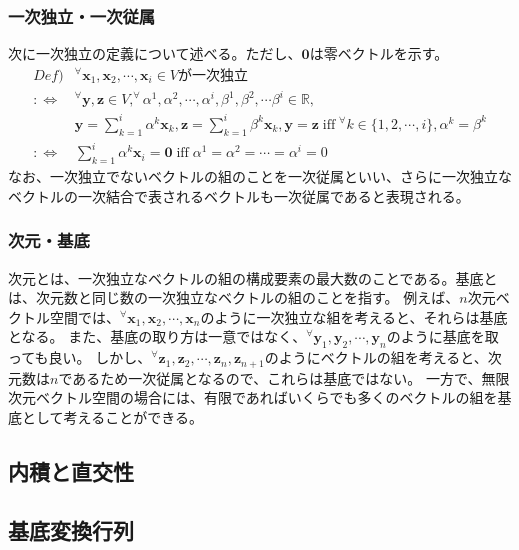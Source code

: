 \documentclass[10pt]{ujarticle}
\begin{document}
\subsubsection{一次独立・一次従属}
次に一次独立の定義について述べる。ただし、$\mathbf{0}$は零ベクトルを示す。
$$
\begin{aligned}
  Def)& ^\forall\mathbf{x}_1,\mathbf{x}_2,\cdots,\mathbf{x}_i\in V\text{が一次独立}\\
  :\Leftrightarrow & ^\forall\mathbf{y},\mathbf{z}\in V, ^\forall\alpha^1,\alpha^2,\cdots,\alpha^i,\beta^1,\beta^2,\cdots\beta^i\in\mathbb{R},\\
  & \mathbf{y}=\sum_{k=1}^{i}\alpha^k\mathbf{x}_k,\mathbf{z}=\sum_{k=1}^{i}\beta^k\mathbf{x}_k,\mathbf{y}=\mathbf{z}\;\text{iff}\; ^\forall k\in\{1,2,\cdots,i\},\alpha^k=\beta^k\\
  :\Leftrightarrow & \sum_{k=1}^{i}\alpha^k\mathbf{x}_i=\mathbf{0}\;\text{iff}\;\alpha^1=\alpha^2=\cdots=\alpha^i=0
\end{aligned}
$$
なお、一次独立でないベクトルの組のことを一次従属といい、さらに一次独立なベクトルの一次結合で表されるベクトルも一次従属であると表現される。

\subsubsection{次元・基底}
次元とは、一次独立なベクトルの組の構成要素の最大数のことである。基底とは、次元数と同じ数の一次独立なベクトルの組のことを指す。
例えば、$n$次元ベクトル空間では、$^\forall\mathbf{x}_1,\mathbf{x}_2,\cdots,\mathbf{x}_n$のように一次独立な組を考えると、それらは基底となる。
また、基底の取り方は一意ではなく、$^\forall\mathbf{y}_1,\mathbf{y}_2,\cdots,\mathbf{y}_n$のように基底を取っても良い。
しかし、$^\forall\mathbf{z}_1,\mathbf{z}_2,\cdots,\mathbf{z}_n,\mathbf{z}_{n+1}$のようにベクトルの組を考えると、次元数は$n$であるため一次従属となるので、これらは基底ではない。
一方で、無限次元ベクトル空間の場合には、有限であればいくらでも多くのベクトルの組を基底として考えることができる。

\hypertarget{innerprod}{\subsection{内積と直交性}}

\subsection{基底変換行列}
\end{document}

